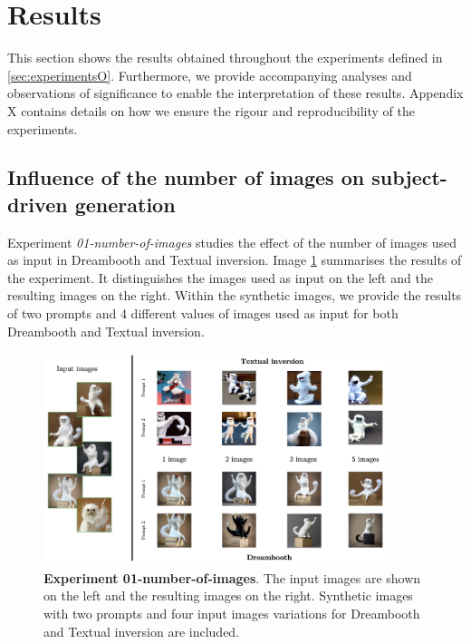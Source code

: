 \section{Results} \label{sec: results} 

This section shows the results obtained throughout the experiments defined in \ref{sec:experimentsO}. Furthermore, we provide accompanying analyses and observations of significance to enable the interpretation of these results. Appendix X contains details on how we ensure the rigour and reproducibility of the experiments.

\subsection{Influence of the number of images on subject-driven generation} \label{sec: exp-01}

Experiment \textit{01-number-of-images} studies the effect of the number of images used as input in Dreambooth and Textual inversion. Image \ref{fig:exp1} summarises the results of the experiment. It distinguishes the images used as input on the left and the resulting images on the right. Within the synthetic images, we provide the results of two prompts and 4 different values of images used as input for both Dreambooth and Textual inversion.   

\begin{figure}
    \centering
    \includegraphics[width=0.90\textwidth]{Pictures/exp1.png} 
    \caption{\textbf{Experiment 01-number-of-images}. The input images are shown on the left and the resulting images on the right. Synthetic images with two prompts and four input images variations for Dreambooth and Textual inversion are included.}
    \label{fig:exp1}
\end{figure}

